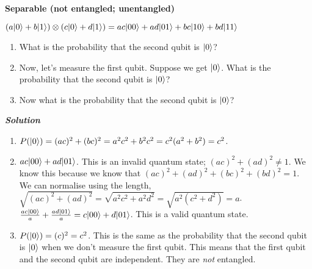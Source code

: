 \pagebreak

\begin{example}
    \textbf{Separable (not entangled; unentangled)}

    $(a\lvert0\rangle + b\lvert1\rangle) \otimes (c\lvert0\rangle + d\lvert1\rangle) = ac\lvert0 0\rangle + ad\lvert0 1\rangle + bc\lvert1 0\rangle + bd\lvert1 1\rangle$
    \begin{enumerate}
        \item What is the probability that the second qubit is $\lvert0\rangle$?
        \item Now, let's measure the first qubit. Suppose we get $\lvert0\rangle$. What is the probability that the second qubit is $\lvert0\rangle$?
        \item Now what is the probability that the second qubit is $\lvert0\rangle$?
    \end{enumerate}
    \textbf{\emph{Solution}}
    \begin{enumerate}
        \item $P(\lvert0\rangle) = (ac)^2 + (bc)^2 = a^2 c^2 + b^2 c^2 = c^2(a^2 + b^2) = c^2$.
        \item  $ac\lvert00\rangle + ad\lvert01\rangle$. This is an invalid quantum state; $(ac)^2 + (ad)^2 \neq 1$. We know this because we know that $(ac)^2 + (ad)^2 + (bc)^2 + (bd)^2 = 1$. We can normalise using the length, $\sqrt{(ac)^2 + (ad)^2} = \sqrt{a^2 c^2 + a^2 d^2} = \sqrt{a^2(c^2 + d^2)} = a$. $\frac{ac\lvert00\rangle}{a} + \frac{ad\lvert01\rangle}{a} = c\lvert00\rangle + d\lvert01\rangle$. This is a valid quantum state.
        \item $P(\lvert0\rangle) = (c)^2 = c^2$. This is the same as the probability that the second qubit is $\lvert0\rangle$ when we don't measure the first qubit. This means that the first qubit and the second qubit are independent. They are \emph{not} entangled.
    \end{enumerate}
\end{example}

